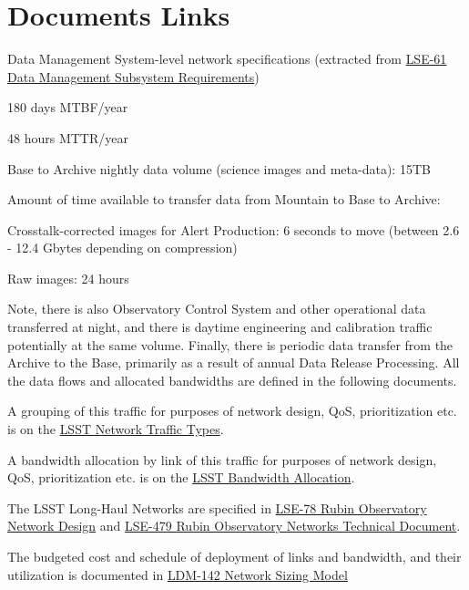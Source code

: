 
\section{Documents Links}

Data Management System-level network specifications (extracted from \href{https://confluence.lsstcorp.org/download/attachments/20284335/LSE-61.pdf?version=1&modificationDate=1490879770000&api=v2}{LSE-61 Data Management Subsystem Requirements})

180 days MTBF/year

48 hours MTTR/year

Base to Archive nightly data volume (science images and meta-data): 15TB

Amount of time available to transfer data from Mountain to Base to Archive:

                 Crosstalk-corrected images for Alert Production: 6 seconds to move (between 2.6 - 12.4 Gbytes depending on compression)

                 Raw images: 24 hours

Note, there is also Observatory Control System and other operational data transferred at night, and there is daytime engineering and calibration traffic potentially at the same volume.  Finally, there is periodic data transfer from the Archive to the Base, primarily as a result of annual Data Release Processing.  All the data flows and allocated bandwidths are defined in the following documents.

A grouping of this traffic for purposes of network design, QoS, prioritization etc. is on the \href{https://confluence.lsstcorp.org/display/DM/LSST+Network+Traffic+Types}{LSST Network Traffic Types}.

A bandwidth allocation by link of this traffic for purposes of network design, QoS, prioritization etc. is on the \href{https://confluence.lsstcorp.org/display/DM/LSST+Network+Bandwidth+Allocation}{LSST Bandwidth Allocation}.

The LSST Long-Haul Networks are specified in \href{https://docushare.lsstcorp.org/docushare/dsweb/Get/LSE-78/lse78observatoryNetworkDesign_rel5.1_20200825.pdf}{LSE-78 Rubin Observatory Network Design} and \href{https://docushare.lsstcorp.org/docushare/dsweb/Get/LSE-479/lse479observatoryNetworkTechnicalDoc_rel1_20200825.pdf}{LSE-479 Rubin Observatory Networks Technical Document}.

The budgeted cost and schedule of deployment of links and bandwidth, and their utilization is documented in \href{https://confluence.lsstcorp.org/download/attachments/20284335/20170130%20LDM-142%20LSST%20Networks%20BL%20and%20Plan.xls?version=1&modificationDate=1491479508000&api=v2}{LDM-142 Network Sizing Model}

